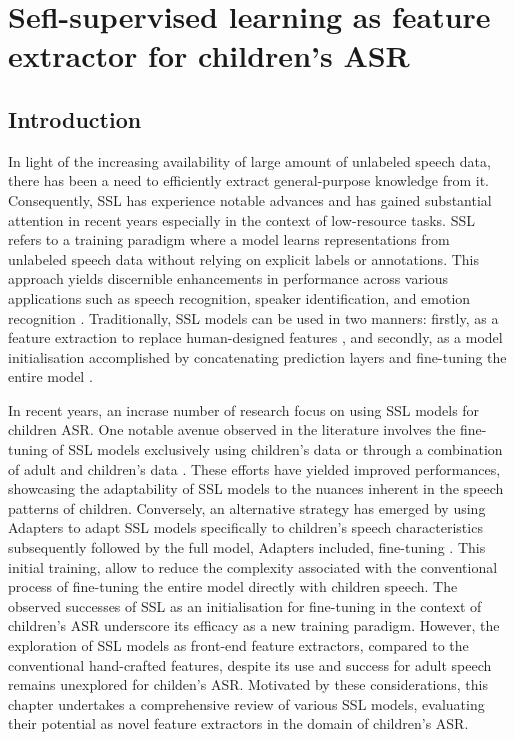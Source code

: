 \chapter{Sefl-supervised learning as feature extractor for children's \ac{ASR}}
\label{chapter:appendixB}

\section{Introduction}
In light of the increasing availability of large amount of unlabeled speech data, there has been a need to efficiently extract general-purpose knowledge from it. Consequently, \ac{SSL} has experience notable advances and has gained substantial attention in recent years especially in the context of low-resource tasks. \ac{SSL} refers to a training paradigm where a model learns representations from unlabeled speech data without relying on explicit labels or annotations. This approach yields discernible enhancements in performance across various applications such as speech recognition, speaker identification, and emotion recognition \cite{baevski2020wav2vec}. Traditionally, \ac{SSL} models can be used in two manners: firstly, as a feature extraction to replace human-designed features \cite{yang21c_interspeech,chang2021exploration}, and secondly, as a model initialisation accomplished by concatenating prediction layers and fine-tuning the entire model \cite{fan2022draft,jain2023wav2vec2,wang2021fine,li2021accent}.

In recent years, an incrase number of research focus on using \ac{SSL} models for children \ac{ASR}. One notable avenue observed in the literature involves the fine-tuning of \ac{SSL} models exclusively using children's data \cite{jain2023adaptation} or through a combination of adult and children's data \cite{jain2023wav2vec2}. These efforts have yielded improved performances, showcasing the adaptability of \ac{SSL} models to the nuances inherent in the speech patterns of children. Conversely, an alternative strategy has emerged by using Adapters to adapt \ac{SSL} models specifically to children's speech characteristics subsequently followed by the full model, Adapters included, fine-tuning \cite{fan2022draft}. This initial training, allow to reduce the complexity associated with the conventional process of fine-tuning the entire model directly with children speech.
The observed successes of \ac{SSL} as an initialisation for fine-tuning in the context of children's \ac{ASR} underscore its efficacy as a new training paradigm. However, the exploration of \ac{SSL} models as front-end feature extractors, compared to the conventional hand-crafted features, despite its use and success for adult speech \cite{yang21c_interspeech,chang2021exploration} remains unexplored for childen's \ac{ASR}. Motivated by these considerations, this chapter undertakes a comprehensive review of various \ac{SSL} models, evaluating their potential as novel feature extractors in the domain of children's \ac{ASR}.
